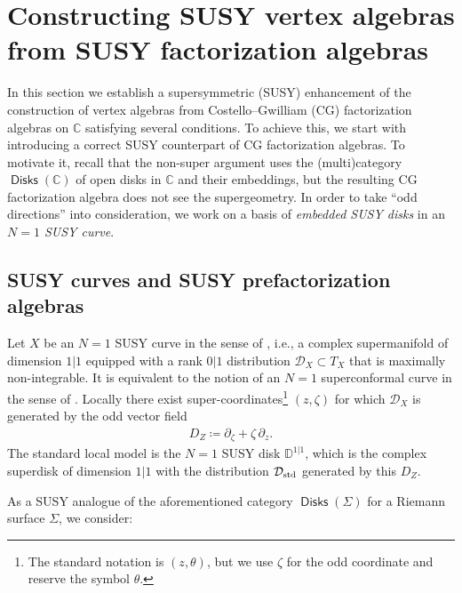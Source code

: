 \documentclass[final,reqno]{amsart}
\numberwithin{equation}{section}
\theoremstyle{definition}
\newcommand{\ceq}{\coloneqq} %
\newcommand{\std}{\textup{std}}
\newcommand{\bbC}{\mathbb{C}}
\newcommand{\sD}{\mathbb{D}^{1|1}}
\newcommand{\clD}{\mathcal{D}}
\newcommand{\pd}{\partial}
\DeclareMathOperator{\Disk}{\mathsf{Disks}}
\begin{document}
\section{Constructing SUSY vertex algebras from SUSY factorization algebras}
\label{s:1}

In this section we establish a supersymmetric (SUSY) enhancement of 
the construction \cite[Chap.\ 5]{CG1}
of vertex algebras from Costello--Gwilliam (CG) factorization algebras
on $\bbC$ satisfying several conditions. 
To achieve this, we start with introducing a correct SUSY counterpart 
of CG factorization algebras.
To motivate it, recall that the non-super argument \cite[\S3.1, \S5.1]{CG1} 
uses the (multi)category $\Disk(\bbC)$ 
of open disks in $\bbC$ and their embeddings, 
but the resulting CG factorization algebra does not see the supergeometry.
In order to take ``odd directions'' into consideration, we work on 
a basis of \emph{embedded SUSY disks} in an \emph{$N=1$ SUSY curve}.

\subsection{SUSY curves and SUSY prefactorization algebras}
\label{ss:1.1}

Let $X$ be an $N=1$ SUSY curve in the sense of \cite[Chap.\ 2]{M}, 
i.e., a complex supermanifold of dimension $1|1$ 
equipped with a rank $0|1$ distribution $\clD_X \subset T_X$ 
that is maximally non-integrable. 
It is equivalent to the notion of an $N=1$ superconformal curve 
in the sense of \cite{BR}.
Locally there exist super-coordinates\footnote{The standard notation is
 $(z,\theta)$, but we use $\zeta$ for the odd coordinate 
 and reserve the symbol $\theta$.} 
$(z,\zeta)$ for which $\clD_X$ is generated by the odd vector field
\begin{align}\label{eq:1:D}
 D_Z \ceq \pd_{\zeta} + \zeta\,\pd_z.
\end{align}
The standard local model is the $N=1$ SUSY disk $\sD$,
which is the complex superdisk of dimension $1|1$ 
with the distribution $\clD_{\std}$ generated by this $D_Z$.

As a SUSY analogue of the aforementioned category $\Disk(\Sigma)$ 
for a Riemann surface $\Sigma$, we consider:
\end{document}
